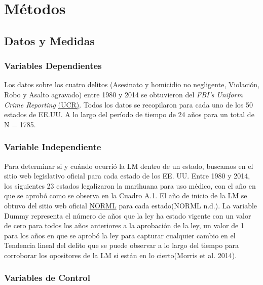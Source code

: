 \documentclass[11pt,]{article}
\begin{document}
\hypertarget{metodos}{%
\section{Métodos}\label{metodos}}

\hypertarget{datos-y-medidas}{%
\subsection{Datos y Medidas}\label{datos-y-medidas}}

\hypertarget{variables-dependientes}{%
\subsubsection{Variables Dependientes}\label{variables-dependientes}}

Los datos sobre los cuatro delitos (Asesinato y homicidio no negligente,
Violación, Robo y Asalto agravado) entre 1980 y 2014 se obtuvieron del
\emph{FBI's Uniform Crime Reporting} \href{https://bjs.gov/}{(UCR)}.
Todos los datos se recopilaron para cada uno de los 50 estados de EE.UU.
A lo largo del período de tiempo de 24 años para un total de N = 1785.

\hypertarget{variable-independiente}{%
\subsubsection{Variable Independiente}\label{variable-independiente}}

Para determinar si y cuándo ocurrió la LM dentro de un estado, buscamos
en el sitio web legislativo oficial para cada estado de los EE. UU.
Entre 1980 y 2014, los siguientes 23 estados legalizaron la marihuana
para uso médico, con el año en que se aprobó como se observa en la
Cuadro A.1. El año de inicio de la LM se obtuvo del sitio web oficial
\href{https://norml.org/states}{NORML} para cada estado(NORML n.d.). La
variable Dummy representa el número de años que la ley ha estado vigente
con un valor de cero para todos los años anteriores a la aprobación de
la ley, un valor de 1 para los años en que se aprobó la ley para
capturar cualquier cambio en el Tendencia lineal del delito que se puede
observar a lo largo del tiempo para corroborar los opositores de la LM
si están en lo cierto(Morris et al. 2014).

\hypertarget{variables-de-control}{%
\subsubsection{Variables de Control}\label{variables-de-control}}
\end{document}
